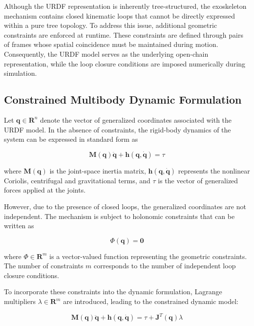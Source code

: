 Although the URDF representation is inherently tree-structured, the exoskeleton mechanism contains closed kinematic loops that cannot be directly expressed within a pure tree topology. To address this issue, additional geometric constraints are enforced at runtime. These constraints are defined through pairs of frames whose spatial coincidence must be maintained during motion. Consequently, the URDF model serves as the underlying open-chain representation, while the loop closure conditions are imposed numerically during simulation.

\subsection{Constrained Multibody Dynamic Formulation}
Let $\textbf{q} \in \textbf{R}^n$ denote the vector of generalized coordinates associated with the URDF model. In the absence of constraints, the rigid-body dynamics of the system can be expressed in standard form as

\begin{equation}
\textbf{M}(\textbf{q})\ddot{\textbf{q}} + \textbf{h}(\textbf{q},\dot{\textbf{q}}) = \tau
\end{equation}

where $\textbf{M}(\textbf{q})$ is the joint-space inertia matrix, $\textbf{h}(\textbf{q},\dot{\textbf{q}})$ represents the nonlinear Coriolis, centrifugal and gravitational terms, and $\tau$ is the vector of generalized forces applied at the joints. 

However, due to the presence of closed loops, the generalized coordinates are not independent. The mechanism is subject to holonomic constraints that can be written as

\begin{equation}
\Phi(\textbf{q}) = \textbf{0}
\end{equation}

where $\Phi \in \textbf{R}^m$ is a vector-valued function representing the geometric constraints. The number of constraints $m$ corresponds to the number of independent loop closure conditions.

To incorporate these constraints into the dynamic formulation, Lagrange multipliers $\lambda \in \textbf{R}^m$ are introduced, leading to the constrained dynamic model:

\begin{equation}
\textbf{M}(\textbf{q})\ddot{\textbf{q}} + \textbf{h}(\textbf{q},\dot{\textbf{q}}) = \tau + \textbf{J}^T(\textbf{q})\lambda
\end{equation}

